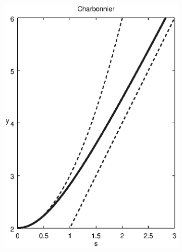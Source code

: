 \documentclass[journal]{vgtc}
\begin{document}
\begin{figure}[htb]
\centering
\begin{subfigure}{0.49\linewidth}
\centering
\includegraphics[width=\linewidth]{images/charbonnier.eps}
\end{subfigure}
\begin{subfigure}{0.49\linewidth}
\centering

\end{subfigure}
\end{figure}
\end{document}
